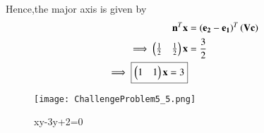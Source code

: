 \documentclass[journal,12pt,twocolumn]{IEEEtran}
\begin{document}
\begin{enumerate}
    Hence,the major axis is given by
    \begin{align}
        \mathbf{n}^T\mathbf{x} &=\left(\mathbf{e_2}- \mathbf{e_1}\right)^T\left(\mathbf{V}\mathbf{c}\right)
        \\
        \implies \begin{pmatrix}\frac{1}{2} & \frac{1}{2}\end{pmatrix}\mathbf{x} &= \frac{3}{2}
        \\
        \implies \boxed{\begin{pmatrix}1 & 1\end{pmatrix}\mathbf{x} = 3}
    \end{align}
    
    \begin{figure}[!ht]
    \centering
    \texttt{[image: ChallengeProblem5\_5.png]}
    \caption{xy-3y+2=0}
    \label{ex5}	
    \end{figure}
    
\end{enumerate}
\end{document}
